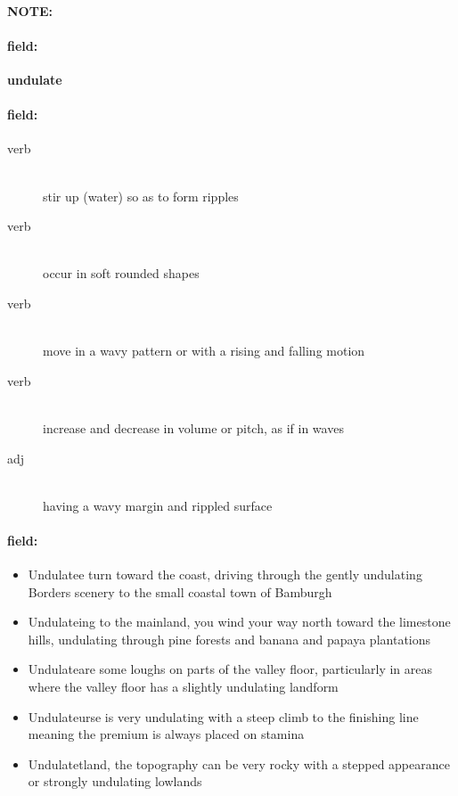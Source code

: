 \documentclass[12pt]{article}
\newenvironment{note}{\paragraph{NOTE:}}{}
\newenvironment{field}{\paragraph{field:}}{}
\begin{document}
\begin{note}
\begin{field}
\textbf{\large undulate}
\end{field}


\begin{field}
\begin{description}
\item[verb] \hfill \\ 
stir up (water) so as to form ripples

\item[verb] \hfill \\ 
occur in soft rounded shapes

\item[verb] \hfill \\ 
move in a wavy pattern or with a rising and falling motion

\item[verb] \hfill \\ 
increase and decrease in volume or pitch, as if in waves

\item[adj] \hfill \\ 
having a wavy margin and rippled surface

\end{description}
\end{field}

\begin{field}
\begin{itemize}
\item Undulatee turn toward the coast, driving through the gently undulating Borders scenery to the small coastal town of Bamburgh
\item Undulateing to the mainland, you wind your way north toward the limestone hills, undulating through pine forests and banana and papaya plantations
\item Undulateare some loughs on parts of the valley floor, particularly in areas where the valley floor has a slightly undulating landform
\item Undulateurse is very undulating with a steep climb to the finishing line meaning the premium is always placed on stamina
\item Undulatetland, the topography can be very rocky with a stepped appearance or strongly undulating lowlands
\end{itemize}
\end{field}
\end{note}
\end{document}
